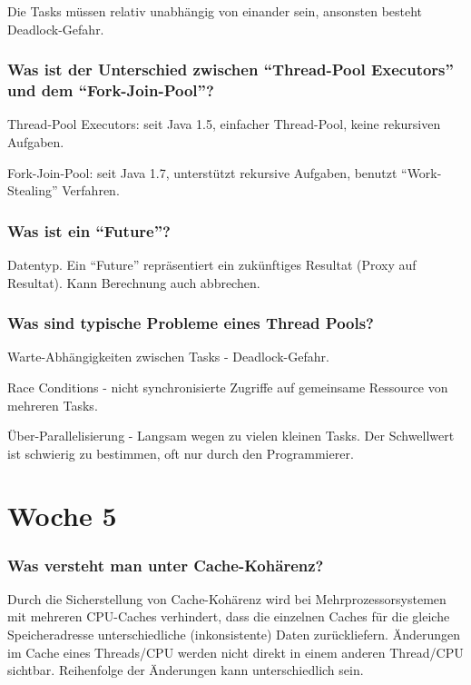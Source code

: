\documentclass[10pt,a4paper]{scrartcl}
\begin{document}
Die Tasks müssen relativ unabhängig von einander sein, ansonsten besteht Deadlock-Gefahr.
  
\subsubsection{Was ist der Unterschied zwischen "`Thread-Pool Executors"' und dem
"`Fork-Join-Pool"'?}

Thread-Pool Executors: seit Java 1.5, einfacher Thread-Pool, keine rekursiven Aufgaben.

Fork-Join-Pool: seit Java 1.7, unterstützt rekursive Aufgaben, benutzt "`Work-Stealing"' Verfahren.
  
\subsubsection{Was ist ein "`Future"'?}

Datentyp. Ein "`Future"' repräsentiert ein zukünftiges Resultat (Proxy auf Resultat). Kann
Berechnung auch abbrechen.
  
\subsubsection{Was sind typische Probleme eines Thread Pools?}

Warte-Abhängigkeiten zwischen Tasks - Deadlock-Gefahr.

Race Conditions - nicht synchronisierte Zugriffe auf gemeinsame Ressource von mehreren Tasks.

Über-Parallelisierung - Langsam wegen zu vielen kleinen Tasks. Der Schwellwert ist schwierig zu
bestimmen, oft nur durch den Programmierer.
  

\section{Woche 5}

\subsubsection{Was versteht man unter Cache-Kohärenz?}

Durch die Sicherstellung von Cache-Kohärenz wird bei Mehrprozessorsystemen mit mehreren CPU-Caches
verhindert, dass die einzelnen Caches für die gleiche Speicheradresse unterschiedliche
(inkonsistente) Daten zurückliefern. Änderungen im Cache eines Threads/CPU werden nicht direkt
in einem anderen Thread/CPU sichtbar. Reihenfolge der Änderungen kann unterschiedlich sein.
  
\end{document}

